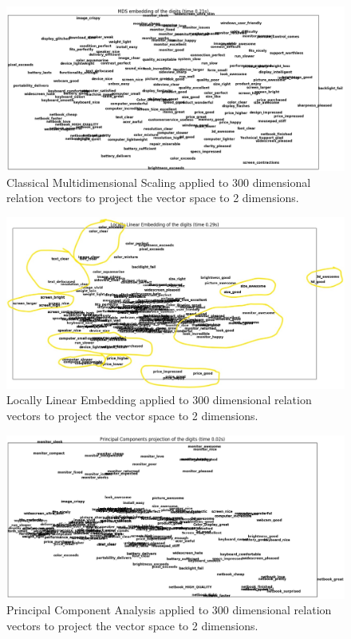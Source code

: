 \documentclass{sig-alternate}
\begin{document}
\begin{figure}
\centering
\includegraphics[scale=0.33]{images/MDS.png}
\caption{Classical Multidimensional Scaling applied to 300 dimensional relation vectors to project the vector space to 2 dimensions.}
\end{figure}

\begin{figure}
\centering
\includegraphics[scale=0.33]{images/locallyLinearEmbedding.jpg}
\caption{Locally Linear Embedding applied to 300 dimensional relation vectors to project the vector space to 2 dimensions.}
\end{figure}

\begin{figure}
\centering
\includegraphics[scale=0.33]{images/PCA.png}
\caption{Principal Component Analysis applied to 300 dimensional relation vectors to project the vector space to 2 dimensions.}
\end{figure}
\end{document}
